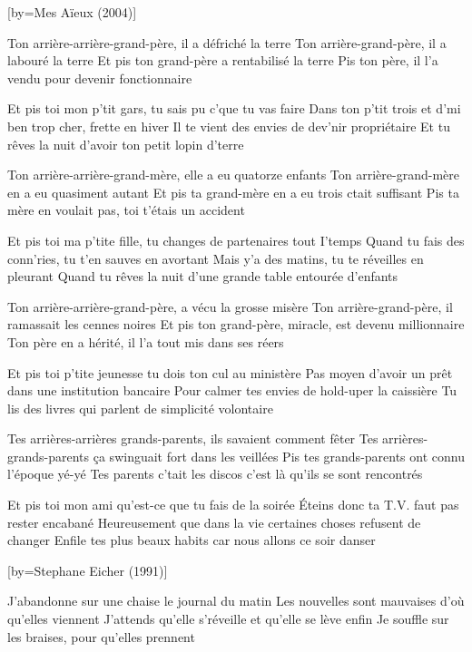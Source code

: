 [by={Mes Aïeux (2004)}]

\beginverse
Ton arrière-arrière-grand-père, il a défriché la terre
Ton arrière-grand-père, il a labouré la terre 
Et pis ton grand-père a rentabilisé la terre
Pis ton père, il l'a vendu pour devenir fonctionnaire
\endverse

\beginverse
Et pis toi mon p'tit gars, tu sais pu c'que tu vas faire
Dans ton p'tit trois et d'mi ben trop cher, frette en hiver
Il te vient des envies de dev'nir propriétaire
Et tu rêves la nuit d'avoir ton petit lopin d'terre
\endverse

\beginverse
Ton arrière-arrière-grand-mère, elle a eu quatorze enfants
Ton arrière-grand-mère en a eu quasiment autant
Et pis ta grand-mère en a eu trois ctait suffisant
Pis ta mère en voulait pas, toi t'étais un accident
\endverse

\beginverse
Et pis toi ma p'tite fille, tu changes de partenaires tout I'temps
Quand tu fais des conn'ries, tu t'en sauves en avortant
Mais y'a des matins, tu te réveilles en pleurant
Quand tu rêves la nuit d'une grande table entourée d'enfants
\endverse

\beginverse
Ton arrière-arrière-grand-père, a vécu la grosse misère
Ton arrière-grand-père, il ramassait les cennes noires
Et pis ton grand-père, miracle, est devenu millionnaire
Ton père en a hérité, il l'a tout mis dans ses réers
\endverse

\beginverse
Et pis toi p'tite jeunesse tu dois ton cul au ministère
Pas moyen d'avoir un prêt dans une institution bancaire
Pour calmer tes envies de hold-uper la caissière
Tu lis des livres qui parlent de simplicité volontaire
\endverse

\beginverse
Tes arrières-arrières grands-parents, ils savaient comment fêter
Tes arrières-grands-parents ça swinguait fort dans les veillées
Pis tes grands-parents ont connu l'époque yé-yé
Tes parents c'tait les discos c'est là qu'ils se sont rencontrés
\endverse

\beginverse
Et pis toi mon ami qu'est-ce que tu fais de la soirée
Éteins donc ta T.V. faut pas rester encabané
Heureusement que dans la vie certaines choses refusent de changer
Enfile tes plus beaux habits car nous allons ce soir danser
\endverse

[by={Stephane Eicher (1991)}]

\beginverse
J'abandonne sur une chaise le journal du matin
Les nouvelles sont mauvaises d'où qu'elles viennent
J'attends qu'elle s'réveille et qu'elle se lève enfin
Je souffle sur les braises, pour qu'elles prennent
\endverse

